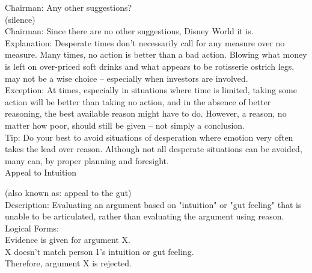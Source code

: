 \documentclass[a4paper,12pt,single,pdftex]{scrbook}
\begin{document}
    
      Chairman: Any other suggestions?
    \\

    
      (silence)
    \\

    
      Chairman: Since there are no other suggestions, Disney World it is.
    \\

    
      Explanation: Desperate times don’t necessarily call for any measure over no measure.  Many times, no action is better than a bad action.  Blowing what money is left on over-priced soft drinks and what appears to be rotisserie ostrich legs, may not be a wise choice -- especially when investors are involved.
    \\

    
      Exception: At times, especially in situations where time is limited, taking some action will be better than taking no action, and in the absence of better reasoning, the best available reason might have to do.  However, a reason, no matter how poor, should still be given -- not simply a conclusion.
    \\

    
      Tip: Do your best to avoid situations of desperation where emotion very often takes the lead over reason.  Although not all desperate situations can be avoided, many can, by proper planning and foresight.
    \\

  

Appeal to Intuition
    
      (also known as: appeal to the gut)
    \\

  
    
      Description: Evaluating an argument based on "intuition" or "gut feeling" that is unable to be articulated, rather than evaluating the argument using reason.
    \\

    
      Logical Forms:
    \\

    
      Evidence is given for argument X.
    \\

    
      X doesn't match person 1's intuition or gut feeling.
    \\

    
      Therefore, argument X is rejected.
    \\

    
       
\end{document}
